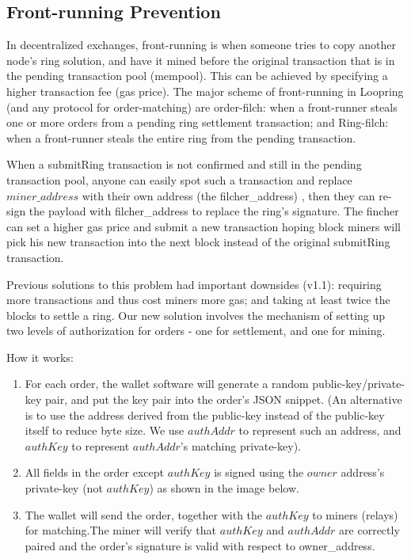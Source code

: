 \documentclass[UTF8,nofonts]{article}
\begin{document}
\begin{multicols}{2}
\subsection{Front-running Prevention\label{sec:dual_authoring}}

In decentralized exchanges, front-running is when someone tries to copy another node's ring solution, and have it mined before the original transaction that is in the pending transaction pool (mempool). This can be achieved by specifying a higher transaction fee (gas price). The major scheme of front-running in Loopring (and any protocol for order-matching) are order-filch: when a front-runner steals one or more orders from a pending ring settlement transaction; and Ring-filch: when a front-runner steals the entire ring from the pending transaction.

When a submitRing transaction is not confirmed and still in the pending transaction pool, anyone can easily spot such a transaction and replace $miner\_address$ with their own address (the filcher\_address) , then they can re-sign the payload with filcher\_address to replace the ring's signature. The fincher can set a higher gas price and submit a new transaction hoping block miners will pick his new transaction into the next block instead of the original submitRing transaction.

Previous solutions to this problem had important downsides (v1.1): requiring more transactions and thus cost miners more gas; and taking at least twice the blocks to settle a ring.  Our new solution involves the mechanism of setting up two levels of authorization for orders - one for settlement, and one for mining.

How it works:

\begin{enumerate}

	\item For each order, the wallet software will generate a random public-key/private-key pair, and put the key pair into the order's JSON snippet. (An alternative is to use the address derived from the public-key instead of the public-key itself to reduce byte size. We use $authAddr$ to represent such an address, and $authKey$ to represent $authAddr$'s matching private-key).

	\item All fields in the order except $authKey$ is signed using the $owner$ address's private-key (not $authKey$) as shown in the image below.

	\item The wallet will send the order, together with the $authKey$ to miners (relays) for matching.The miner will verify that $authKey$ and $authAddr$ are correctly paired and the order's signature is valid with respect to owner\_address.


\end{enumerate}
\end{multicols}
\end{document}
